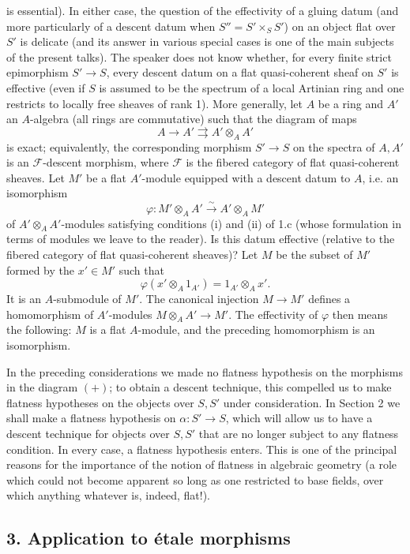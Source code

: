 is essential). In either case, the question of the effectivity of a gluing
datum (and more particularly of a descent datum when $S''=S'\times_SS'$) on an
object flat over $S'$ is delicate (and its answer in various special cases is
one of the main subjects of the present talks). The speaker does not know
whether, for every finite strict epimorphism $S'\longrightarrow S$, every
descent datum on a flat quasi-coherent sheaf on $S'$ is effective (even if $S$
is assumed to be the spectrum of a local Artinian ring and one restricts to
locally free sheaves of rank 1). More generally, let $A$ be a ring and $A'$ an
$A$-algebra (all rings are commutative) such that the diagram of maps
\[
  A\longrightarrow A'\rightrightarrows A'\otimes_AA'
\]
is exact; equivalently, the corresponding morphism $S'\longrightarrow S$ on
the spectra of $A,A'$ is an $\mathcal F$-descent morphism, where $\mathcal F$
is the fibered category of flat quasi-coherent sheaves. Let $M'$ be a flat
$A'$-module equipped with a descent datum to $A$, i.e. an isomorphism
\[
  \varphi:M'\otimes_AA'\xrightarrow{\sim}A'\otimes_AM'
\]
of $A'\otimes_AA'$-modules satisfying conditions (i) and (ii) of 1.c (whose
formulation in terms of modules we leave to the reader). Is this datum
effective (relative to the fibered category of flat quasi-coherent sheaves)?
Let $M$ be the subset of $M'$ formed by the $x'\in M'$ such that
\[
  \varphi(x'\otimes_A1_{A'})=1_{A'}\otimes_Ax'.
\]
It is an $A$-submodule of $M'$. The canonical injection
$M\longrightarrow M'$ defines a homomorphism of $A'$-modules
$M\otimes_AA'\longrightarrow M'$. The effectivity of $\varphi$ then means the
following: $M$ is a flat $A$-module, and the preceding homomorphism is an
isomorphism.

 In the preceding considerations we made no flatness
hypothesis on the morphisms in the diagram $(+)$; to obtain a descent
technique, this compelled us to make flatness hypotheses on the objects over
$S,S'$ under consideration. In Section 2 we shall make a flatness hypothesis
on $\alpha:S'\longrightarrow S$, which will allow us to have a descent
technique for objects over $S,S'$ that are no longer subject to any flatness
condition. In every case, a flatness hypothesis enters. This is one of the
principal reasons for the importance of the notion of flatness in algebraic
geometry (a role which could not become apparent so long as one restricted to
base fields, over which anything whatever is, indeed, flat!).

\subsection*{3. Application to étale morphisms}

